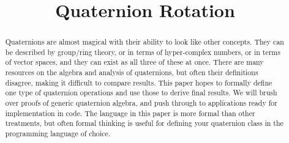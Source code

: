 \documentclass{amsart}
\theoremstyle{definition}
\theoremstyle{remark}
\numberwithin{equation}{section}
\begin{document}
\title{Quaternion Rotation}

\begin{abstract}
Quaternions are almost magical with their ability to look like other concepts. They can be described by group/ring theory, or in terms of hyper-complex numbers, or in terms of vector spaces, and they can exist as all three of these at once. There are many resources on the algebra and analysis of quaternions, but often their definitions disagree, making it difficult to compare results. This paper hopes to formally define one type of quaternion operations and use those to derive final results. We will brush over proofs of generic quaternion algebra, and push through to applications ready for implementation in code. The language in this paper is more formal than other treatments, but often formal thinking is useful for defining your quaternion class in the programming language of choice.
\end{abstract}

\maketitle
\end{document}

